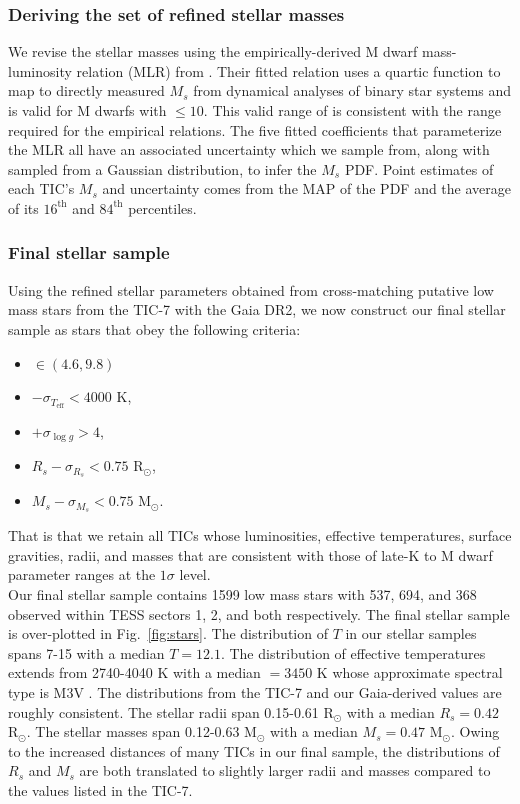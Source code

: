 \subsubsection{Deriving the set of refined stellar masses}
We revise the stellar masses using the empirically-derived M dwarf mass-luminosity relation (MLR) from  
\cite{benedict16}. Their fitted relation uses a quartic function to map \MK{} to directly measured $M_s$ from
dynamical analyses of binary star systems and is valid for M dwarfs with \MK{} $\leq 10$. This valid range of 
\MK{} is consistent with the range required for the \cite{mann15} empirical relations. The five fitted
coefficients that parameterize the MLR all have an associated uncertainty which we sample from, along with \MK{}
sampled from a Gaussian distribution, to infer the $M_s$ PDF. Point estimates of each TIC's $M_s$ and uncertainty
comes from the MAP of the PDF and the average of its $16^{\text{th}}$ and $84^{\text{th}}$ percentiles. 

\subsubsection{Final stellar sample}
Using the refined stellar parameters obtained from cross-matching putative low mass stars from the TIC-7 with
the Gaia DR2, we now construct our final stellar sample as stars that obey the following criteria:

\begin{itemize}
\item \MK{} $\in (4.6,9.8)$
\item \teff{} $- \sigma_{T_{\text{eff}}} < 4000$ K,
\item \logg{} $+ \sigma_{\log{g}}>4$,
\item $R_s -\sigma_{R_s} < 0.75$ R$_{\odot}$,
\item $M_s - \sigma_{M_s} < 0.75$ M$_{\odot}$.
\end{itemize}

\noindent That is that we retain all TICs whose luminosities, effective temperatures, surface
gravities, radii, and masses that are consistent with those of late-K to M dwarf parameter ranges
\citep{pecaut13} at the $1\sigma$ level. \\

Our final stellar sample contains 1599 low mass stars with 537, 694, and 368
observed within TESS sectors 1, 2, and both respectively.
The final stellar sample is over-plotted in Fig.~\ref{fig:stars}. The distribution of $T$
in our stellar samples spans 7-15 with a median $T=12.1$. The distribution of
effective temperatures extends from 2740-4040 K with a median \teff{} $=3450$ K
whose approximate spectral type is M3V \citep{pecaut13}. The \teff{} distributions from the TIC-7 and
our Gaia-derived values are roughly consistent. The stellar radii span 0.15-0.61 R$_{\odot}$
with a median $R_s=0.42$ R$_{\odot}$. The stellar masses span 0.12-0.63 M$_{\odot}$
with a median $M_s=0.47$ M$_{\odot}$. Owing to the increased distances of many TICs in our final sample,
the distributions of $R_s$ and $M_s$ are both translated to slightly larger radii and masses compared
to the values listed in the TIC-7.


